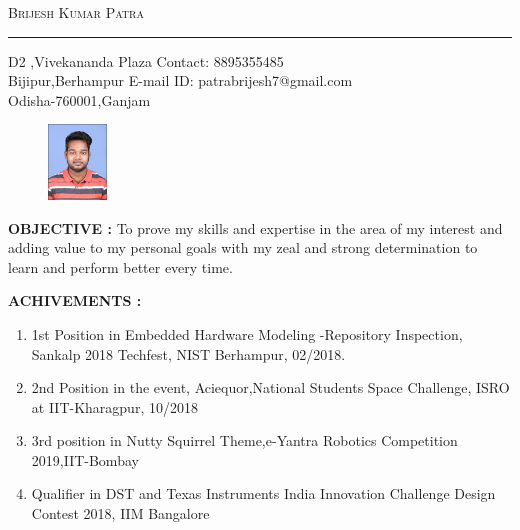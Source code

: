 \documentclass[a4]{article}
\begin{document}
\setlength{\parindent}{0em}

\centerline{
\textsc{\LARGE Brijesh Kumar Patra}
}

\vspace{5mm}
\hrule
\vspace{2mm}

D2 ,Vivekananda Plaza \hspace{7.4cm} Contact: 8895355485\\
Bijipur,Berhampur \hspace{8.2cm} E-mail ID: patrabrijesh7@gmail.com\\
Odisha-760001,Ganjam

\begin{figure}[h!]
\hspace{10.5cm}
\includegraphics[height=2cm]{Resume_pic}
\end{figure}

\vspace{3mm}
\textbf{OBJECTIVE : }
To prove my skills and expertise in the area of my interest and adding value to my personal  goals with my zeal and strong determination to learn and perform better every time.

\vspace{5mm}
\textbf{ACHIVEMENTS : } 
\vspace{1mm}\\
\begin{enumerate}
\item 1st Position in Embedded Hardware Modeling -Repository Inspection, Sankalp 2018 Techfest, NIST Berhampur, 02/2018.
\item 2nd  Position in the event, Aciequor,National Students Space Challenge, ISRO at IIT-Kharagpur, 10/2018

\item 3rd position in Nutty Squirrel Theme,e-Yantra Robotics Competition 2019,IIT-Bombay
\item Qualifier in DST and Texas Instruments India Innovation Challenge Design Contest 2018, IIM Bangalore
\end{enumerate}
\end{document}
